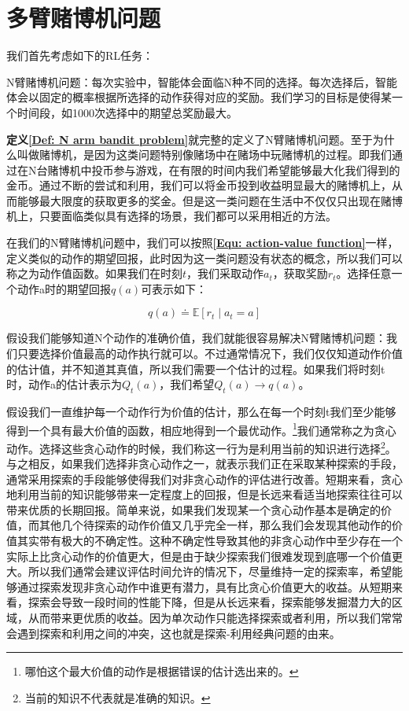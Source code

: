 \section{多臂赌博机问题}

我们首先考虑如下的RL任务：

\begin{Definition}
\label{Def: N arm bandit problem}
N臂赌博机问题：每次实验中，智能体会面临N种不同的选择。每次选择后，智能体会以固定的概率根据所选择的动作获得对应的奖励。我们学习的目标是使得某一个时间段，如1000次选择中的期望总奖励最大。
\end{Definition}

\textbf{定义\ref{Def: N arm bandit problem}}就完整的定义了N臂赌博机问题。至于为什么叫做赌博机，是因为这类问题特别像赌场中在赌场中玩赌博机的过程。即我们通过在N台赌博机中投币参与游戏，在有限的时间内我们希望能够最大化我们得到的金币。通过不断的尝试和利用，我们可以将金币投到收益明显最大的赌博机上，从而能够最大限度的获取更多的奖金。但是这一类问题在生活中不仅仅只出现在赌博机上，只要面临类似具有选择的场景，我们都可以采用相近的方法。

在我们的N臂赌博机问题中，我们可以按照\textbf{\eqref{Equ: action-value function}}一样，定义类似的动作的期望回报，此时因为这一类问题没有状态的概念，所以我们可以称之为动作值函数。如果我们在时刻$t$，我们采取动作$a_t$，获取奖励$r_t$。选择任意一个动作a时的期望回报$q(a)$可表示如下：

\begin{equation}
    q(a) \doteq \mathbb{E}\left[r_{t} \mid a_{t}=a\right]
\end{equation}

假设我们能够知道N个动作的准确价值，我们就能很容易解决N臂赌博机问题：我们只要选择价值最高的动作执行就可以。不过通常情况下，我们仅仅知道动作价值的估计值，并不知道其真值，所以我们需要一个估计的过程。如果我们将时刻t时，动作a的估计表示为$Q_t(a)$，我们希望$Q_t(a)\rightarrow q(a)$。

假设我们一直维护每一个动作行为价值的估计，那么在每一个时刻t我们至少能够得到一个具有最大价值的函数，相应地得到一个最优动作。\footnote{哪怕这个最大价值的动作是根据错误的估计选出来的。}我们通常称之为贪心动作。选择这些贪心动作的时候，我们称这一行为是利用当前的知识进行选择\footnote{当前的知识不代表就是准确的知识。}。与之相反，如果我们选择非贪心动作之一，就表示我们正在采取某种探索的手段，通常采用探索的手段能够使得我们对非贪心动作的评估进行改善。短期来看，贪心地利用当前的知识能够带来一定程度上的回报，但是长远来看适当地探索往往可以带来优质的长期回报。简单来说，如果我们发现某一个贪心动作基本是确定的价值，而其他几个待探索的动作价值又几乎完全一样，那么我们会发现其他动作的价值其实带有极大的不确定性。这种不确定性导致其他的非贪心动作中至少存在一个实际上比贪心动作的价值更大，但是由于缺少探索我们很难发现到底哪一个价值更大。所以我们通常会建议评估时间允许的情况下，尽量维持一定的探索率，希望能够通过探索发现非贪心动作中谁更有潜力，具有比贪心价值更大的收益。从短期来看，探索会导致一段时间的性能下降，但是从长远来看，探索能够发掘潜力大的区域，从而带来更优质的收益。因为单次动作只能选择探索或者利用，所以我们常常会遇到探索和利用之间的冲突，这也就是探索-利用经典问题的由来。

